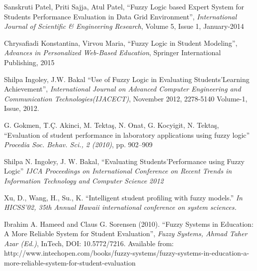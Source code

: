\documentclass[conference]{IEEEtran}
\newcommand{\quotes}[1]{``#1''}
\begin{document}
%
%
%
\begin{thebibliography}{11}


Sanskruti Patel, Priti Sajja, Atul Patel, \quotes{Fuzzy Logic based Expert System for Students Performance Evaluation in Data Grid Environment}, \emph{International Journal of Scientific \& Engineering Research}, Volume 5, Issue 1, January-2014

Chrysafiadi Konstantina, Virvou Maria, \quotes{Fuzzy Logic in Student Modeling}, \emph{Advances in Personalized Web-Based Education}, Springer International Publishing, 2015

Shilpa Ingoley, J.W. Bakal \quotes{Use of Fuzzy Logic in Evaluating Students\rq Learning Achievement}, \emph{International Journal on Advanced Computer Engineering and Communication Technologies(IJACECT)}, November 2012, 2278-5140 Volume-1, Issue, 2012.

G. Gokmen, T.Ç. Akinci, M. Tektaş, N. Onat, G. Kocyigit, N. Tektaş, \quotes{Evaluation of student performance in laboratory applications using fuzzy logic} \emph{Procedia Soc. Behav. Sci., 2 (2010)}, pp. 902–909

Shilpa N. Ingoley, J. W. Bakal, \quotes{Evaluating Students\rq Performance using Fuzzy Logic} \emph{IJCA Proceedings on International Conference on Recent Trends in Information Technology and Computer Science 2012}

Xu, D., Wang, H., Su., K. \quotes{Intelligent student profiling with fuzzy models.} \emph{In HICSS’02, 35th Annual Hawaii international conference on system sciences.}

Ibrahim A. Hameed and Claus G. Sorensen (2010). \quotes{Fuzzy Systems in Education: A More Reliable System for Student Evaluation}, \emph{Fuzzy Systems, Ahmad Taher Azar (Ed.)}, InTech, DOI: 10.5772/7216. Available from: http://www.intechopen.com/books/fuzzy-systems/fuzzy-systems-in-education-a-more-reliable-system-for-student-evaluation


\end{thebibliography}
\end{document}
